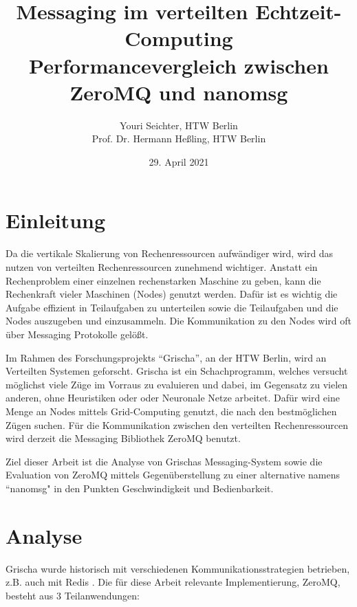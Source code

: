 \documentclass{article}
\title{Messaging im verteilten Echtzeit-Computing\\[0.2em]Performancevergleich zwischen ZeroMQ und nanomsg}
\author{Youri Seichter, HTW Berlin \\ Prof. Dr. Hermann Heßling, HTW Berlin }
\date{29. April 2021}
\begin{document}
\maketitle

\clearpage
\tableofcontents
\clearpage

\section{Einleitung}

Da die vertikale Skalierung von Re\-chen\-re\-ssourc\-en aufwändiger wird, wird
das nutzen von verteilten Re\-chen\-re\-ssourc\-en zunehmend wichtiger. Anstatt
ein Re\-chen\-pro\-blem einer einzelnen re\-chen\-star\-ken Maschine zu geben, kann
die Rech\-en\-kraft vieler Maschinen (Nodes) genutzt werden. Dafür ist es
wichtig die Aufgabe effizient in Teilaufgaben zu unterteilen sowie die
Teilaufgaben und die Nodes auszugeben und einzusammeln. Die
Kommunikation zu den Nodes wird oft über Messaging Protokolle gelößt.

Im Rahmen des Forschungsprojekts ``Grischa'', an der HTW Berlin, wird an
Verteilten Systemen geforscht. Grischa ist ein Schachprogramm, welches
versucht möglichst viele Züge im Vorraus zu evaluieren und dabei, im
Gegensatz zu vielen anderen, ohne Heuristiken oder oder Neuronale Netze
arbeitet. Dafür wird eine Menge an Nodes mittels Grid-Computing genutzt,
die nach den bestmöglichen Zügen suchen. Für die Kommunikation zwischen
den verteilten Rechenressourcen wird derzeit die Messaging Bibliothek
ZeroMQ benutzt.

Ziel dieser Arbeit ist die Analyse von Grischas Messaging-System sowie
die Evaluation von ZeroMQ mittels Gegenüberstellung zu einer alternative
namens ``nanomsg" in den Punkten Geschwindigkeit und Bedienbarkeit.

\section{Analyse}

Grischa wurde historisch mit verschiedenen Kom\-mu\-ni\-ka\-tions\-stra\-te\-gien
be\-trie\-ben, z.B. auch mit Redis \cite{noauthor_redis_nodate}. Die für diese Arbeit relevante
Implementierung, ZeroMQ, besteht aus 3 Teil\-an\-wen\-dun\-gen:
\end{document}
